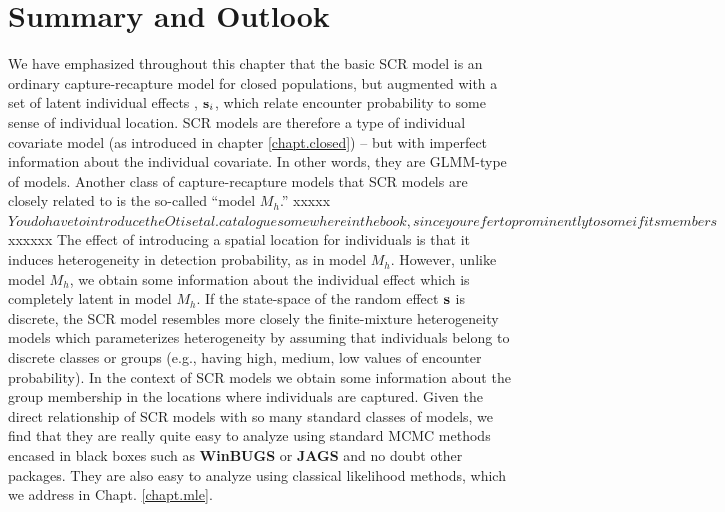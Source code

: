 {



\section{ Summary and Outlook }

We have emphasized throughout this chapter that the basic SCR
model is an ordinary capture-recapture model for
closed populations, but augmented with a set
of latent individual effects , ${\bf s}_{i}$, which relate encounter
probability to some sense of individual location. SCR models are
therefore a type of individual covariate model (as introduced in
chapter \ref{chapt.closed}) -- but with imperfect information about the
individual covariate. In other words, they are GLMM-type of models.
 Another class of capture-recapture models
that SCR models are closely related to is the so-called ``model $M_{h}$.'' xxxxx$You do have to introduce the Otis et al. catalogue somewhere in the book, since you refer to prominently to some if its members$xxxxxx
The effect of introducing a spatial location for individuals is that
it induces heterogeneity in detection probability, as in model
$M_{h}$. However, unlike model $M_{h}$, we obtain some information
about the individual effect which is completely latent in model
$M_{h}$. If the state-space of the random effect ${\bf s}$ is discrete,
the SCR model resembles more closely the finite-mixture 
heterogeneity models \citep{norris_pollock:1996} which parameterizes
heterogeneity by assuming that individuals belong to discrete classes
or groups (e.g., having high, medium, low values of encounter probability). In the context of SCR models we
obtain some information about the group membership  in the
locations where individuals are captured.  Given the direct
relationship of SCR models with so many standard classes of models, we
find that they are really quite easy to analyze using standard MCMC
methods encased in black boxes such as {\bf WinBUGS} or {\bf JAGS} and
no doubt other packages. They are also easy to analyze using classical
likelihood methods, which we address in Chapt. \ref{chapt.mle}.

}
